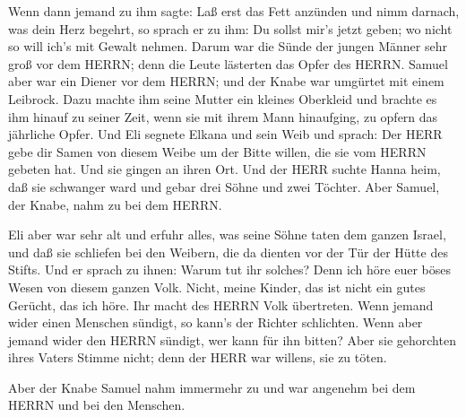  Wenn dann jemand zu ihm sagte: Laß erst das Fett anzünden
und nimm darnach, was dein Herz begehrt, so sprach er zu ihm: Du sollst
mir's jetzt geben; wo nicht so will ich's mit Gewalt nehmen.
 Darum war die Sünde der jungen Männer sehr groß vor dem
HERRN; denn die Leute lästerten das Opfer des HERRN. 
Samuel aber war ein Diener vor dem HERRN; und der Knabe war umgürtet mit
einem Leibrock.  Dazu machte ihm seine Mutter ein kleines
Oberkleid und brachte es ihm hinauf zu seiner Zeit, wenn sie mit ihrem
Mann hinaufging, zu opfern das jährliche Opfer.  Und Eli
segnete Elkana und sein Weib und sprach: Der HERR gebe dir Samen von
diesem Weibe um der Bitte willen, die sie vom HERRN gebeten hat. Und sie
gingen an ihren Ort.  Und der HERR suchte Hanna heim, daß
sie schwanger ward und gebar drei Söhne und zwei Töchter. Aber Samuel,
der Knabe, nahm zu bei dem HERRN.

 Eli aber war sehr alt und erfuhr alles, was seine Söhne
taten dem ganzen Israel, und daß sie schliefen bei den Weibern, die da
dienten vor der Tür der Hütte des Stifts.  Und er sprach zu
ihnen: Warum tut ihr solches? Denn ich höre euer böses Wesen von diesem
ganzen Volk.  Nicht, meine Kinder, das ist nicht ein gutes
Gerücht, das ich höre. Ihr macht des HERRN Volk übertreten.
 Wenn jemand wider einen Menschen sündigt, so kann's der
Richter schlichten. Wenn aber jemand wider den HERRN sündigt, wer kann
für ihn bitten? Aber sie gehorchten ihres Vaters Stimme nicht; denn der
HERR war willens, sie zu töten.

 Aber der Knabe Samuel nahm immermehr zu und war angenehm
bei dem HERRN und bei den Menschen.

